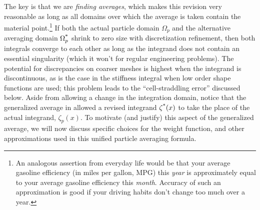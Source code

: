 The key is that we are \emph{finding averages}, which makes this revision very reasonable as long as all domains over which the average is taken contain the  material point.\footnote{An analogous assertion from everyday life would be that your average gasoline efficiency (in miles per gallon, MPG) this \emph{year} is approximately equal to your average gasoline efficiency this \emph{month}. Accuracy of such an approximation is good if your driving habits don't change too much over a year.} If both the actual particle domain $\Omega_p$ and the alternative averaging domain $\Omega_p^{\text{*}}$ shrink to zero size with discretization refinement, then both integrals converge to each other as long as the integrand does not contain an essential singularity (which it won't for regular engineering problems). The potential for discrepancies on coarser meshes is highest when the integrand is discontinuous, as is the case in the stiffness integral when low order shape functions are used; this problem leads to the ``cell-straddling error'' discussed below.  Aside from allowing a change in the integration domain, notice that the generalized average in  allowed a revised integrand $\zeta^{\text{*}}(x)$ to take the place of the actual integrand, $\zeta_p(x)$. To motivate (and justify) this aspect of the generalized average, we will now discuss specific choices for the weight function, and other approximations used in this unified particle averaging formula.

